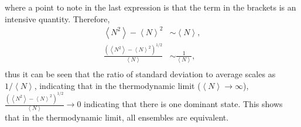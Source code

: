 \documentclass[a4paper]{article}
\begin{document}
where a point to note in the last expression is that the term in the brackets is an intensive quantity. Therefore,
\begin{equation}
\begin{split}
\left<N^{2}\right>-\left<N\right>^{2}&\sim \left<N\right>,\\
\frac{\left(\left<N^{2}\right>-\left<N\right>^{2}\right)^{1/2}}{\left<N\right>}&\sim\frac{1}{\left<N\right>},\\
\end{split}
\end{equation}
thus it can be seen that the ratio of standard deviation  to average scales as $1/\left<N\right>$, indicating that in the thermodynamic limit ($\left<N\right> \rightarrow \infty$), $\frac{\left(\left<N^{2}\right>-\left<N\right>^{2}\right)^{1/2}}{\left<N\right>}\rightarrow 0$ indicating that there is one dominant state. This shows that in the thermodynamic limit, all ensembles are equivalent. 
\end{document}

